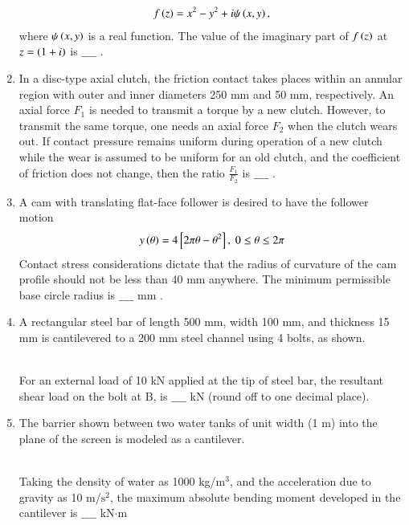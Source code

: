 \documentclass[journal]{IEEEtran}
\begin{document}
\begin{enumerate}
\begin{align*}
    f\left(z\right) = x^2 - y^2 + i\psi\left(x,y\right),
\end{align*}
where $\psi\left(x,y\right)$ is a real function. The value of the imaginary part of $f\left(z\right)$ at $z = \left(1 + i\right)$ is $\_\_\_\_$ . \\
\item In a disc-type axial clutch, the friction contact takes places within an annular region with outer and inner diameters 250 mm and 50 mm, respectively. An axial force $F_1$ is needed to transmit a torque by a new clutch. However, to transmit the same torque, one needs an axial force $F_2$ when the clutch wears out. If contact pressure remains uniform during operation of a new clutch while the wear is assumed to be uniform for an old clutch, and the coefficient of friction does not change, then the ratio $\frac{F_1}{F_2}$ is
$\_\_\_\_$ . \\
\item A cam with translating flat-face follower is desired to have the follower motion 
\begin{align*}
    y\left(\theta\right) = 4 {}\left[2\pi\theta - \theta^2\right],\ 0 \leq \theta \leq 2\pi
\end{align*}
Contact stress considerations dictate that the radius of curvature of the cam profile should not be less than 40 mm anywhere. The minimum permissible base circle radius is $\_\_\_\_$ mm . \\
\item A rectangular steel bar of length 500 mm, width 100 mm, and thickness 15 mm is cantilevered to a 200 mm steel channel using 4 bolts, as shown.
\pagebreak
\begin{figure}[!ht]
\centering
\resizebox{0.7\textwidth}{!}{%

}%
\end{figure}\\
For an external load of 10 kN applied at the tip of steel bar, the resultant shear load on the bolt at B, is $\_\_\_\_$ kN (round off to one decimal place). \\
\item The barrier shown between two water tanks of unit width (1 m) into the plane of the screen is modeled as a cantilever.
\begin{figure}[!ht]
\centering
\resizebox{0.5\textwidth}{!}{%

}%
\end{figure}\\
Taking the density of water as 1000 kg/$\text{m}^3$, and the acceleration due to gravity as 10 m/$\text{s}^2$, the maximum absolute bending moment developed in the cantilever is $\_\_\_\_$ kN$\cdot$m 
\end{enumerate}
\end{document}
